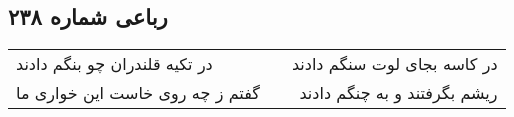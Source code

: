 \begin{center}
\section*{رباعی شماره ۲۳۸}
\label{sec:sh238}
\begin{longtable}{l p{0.5cm} r}
در تکیه قلندران چو بنگم دادند
&&
در کاسه بجای لوت سنگم دادند
\\
گفتم ز چه روی خاست این خواری ما
&&
ریشم بگرفتند و به چنگم دادند
\\
\end{longtable}
\end{center}
